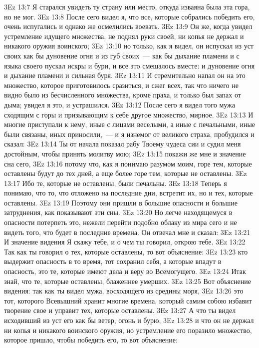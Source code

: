 \vs 3Ez 13:7 Я старался увидеть ту страну или место, откуда изваяна была эта гора, но не мог.
\vs 3Ez 13:8 После сего видел я, что все, которые собрались победить его, очень испугались и однако же осмелились воевать.
\vs 3Ez 13:9 Он же, когда увидел устремление идущего множества, не поднял руки своей, ни копья не держал и никакого оружия воинского;
\vs 3Ez 13:10 но только, как я видел, он испускал из уст своих как бы дуновение огня и из губ своих~--- как бы дыхание пламени и с языка своего пускал искры и бури, и все это смешалось вместе: и дуновение огня и дыхание пламени и сильная буря.
\vs 3Ez 13:11 И стремительно напал он на это множество, которое приготовилось сразиться, и сжег всех, так что ничего не видно было из бесчисленного множества, кроме праха, и только был запах от дыма; увидел я это, и устрашился.
\vs 3Ez 13:12 После сего я видел того мужа сходящим с горы и призывающим к себе другое множество, мирное.
\vs 3Ez 13:13 И многие приступали к нему, иные с лицами веселыми, а иные с печальными, иные были связаны, иных приносили,~--- и я изнемог от великого страха, пробудился и сказал:
\vs 3Ez 13:14 Ты от начала показал рабу Твоему чудеса сии и судил меня достойным, чтобы принять молитву мою;
\vs 3Ez 13:15 покажи же мне и значение сна сего,
\vs 3Ez 13:16 потому что, как я понимаю разумом моим, горе тем, которые оставлены будут до тех дней, а еще более горе тем, которые не оставлены.
\vs 3Ez 13:17 Ибо те, которые не оставлены, были печальны.
\vs 3Ez 13:18 Теперь я понимаю, что то, что отложено на последние дни, встретит их, но и тех, которые оставлены.
\vs 3Ez 13:19 Поэтому они пришли в большие опасности и большие затруднения, как показывают эти сны.
\vs 3Ez 13:20 Но легче находящемуся в опасности потерпеть это, нежели перейти подобно облаку из мира сего и не видеть того, что будет в последние времена. Он отвечал мне и сказал:
\vs 3Ez 13:21 И значение видения Я скажу тебе, и о чем ты говорил, открою тебе.
\vs 3Ez 13:22 Так как ты говорил о тех, которые оставлены, то вот объяснение:
\vs 3Ez 13:23 кто выдержит опасность в то время, тот сохранил себя, а которые впадут в опасность, это те, которые имеют дела и веру во Всемогущего.
\vs 3Ez 13:24 Итак знай, что те, которые оставлены, блаженнее умерших.
\vs 3Ez 13:25 Вот объяснение видения: так как ты видел мужа, восходящего из средины моря,
\vs 3Ez 13:26 это тот, которого Всевышний хранит многие времена, который самим собою избавит творение свое и управит тех, которые оставлены.
\vs 3Ez 13:27 А что ты видел исходивший из уст его как бы ветер, огонь и бурю,
\vs 3Ez 13:28 и что он не держал ни копья и никакого воинского оружия, но устремление его поразило множество, которое пришло, чтобы победить его, то вот объяснение:
